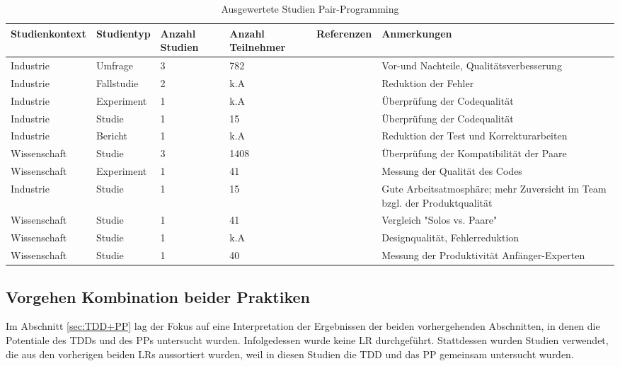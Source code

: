 \begin{table*}[t]
\renewcommand{\arraystretch}{1.3}
\caption{Ausgewertete Studien Pair-Programming}
\label{table:PPStudien}
\centering
\begin{tabularx}{\textwidth}{@{}lllllX@{}}
\toprule


Studienkontext & Studientyp & Anzahl Studien & Anzahl Teilnehmer & Referenzen & Anmerkungen \\ \midrule
Industrie & Umfrage & 3 & 782 & \cite{Bevan2002GuidelinesClass,Williams2006ExaminingProgrammers,Williams2010PairProgramming}  & Vor-und Nachteile, Qualitätsverbesserung \\
Industrie & Fallstudie & 2 & k.A & \cite{Bevan2002GuidelinesClass}  & Reduktion der Fehler \\
Industrie & Experiment & 1 & k.A & \cite{Williams2010PairProgramming}  & Überprüfung der Codequalität \\
Industrie & Studie & 1 & 15 & \cite{Bevan2002GuidelinesClass} & Überprüfung der Codequalität \\
Industrie & Bericht & 1 & k.A & \cite{Williams2010PairProgramming} & Reduktion der Test und Korrekturarbeiten \\
Wissenschaft & Studie & 3 & 1408 & \cite{Bevan2002GuidelinesClass,Williams2010PairProgramming}  & Überprüfung der Kompatibilität der Paare \\
Wissenschaft & Experiment & 1 & 41 & \cite{Bevan2002GuidelinesClass}  & Messung der Qualität des Codes \\
Industrie & Studie & 1 & 15 & \cite{Williams2006ExaminingProgrammers,Nosek1998TheProgramming}  & Gute Arbeitsatmosphäre; mehr Zuversicht im Team bzgl. der Produktqualität \\
Wissenschaft & Studie & 1 & 41 & \cite{Williams2000StrengtheningPair-Programming, Alshehri2014RankingProgramming}  & Vergleich "Solos vs. Paare" \\
Wissenschaft & Studie & 1 & k.A & \cite{Cockburn2001TheProgramming}  & Designqualität, Fehlerreduktion \\
Wissenschaft & Studie & 1 & 40 & \cite{Lui2006PairExpertexpert,Alshehri2014RankingProgramming} & Messung der Produktivität Anfänger-Experten \\ \bottomrule
\end{tabularx}
\end{table*}

\subsection{Vorgehen Kombination beider Praktiken}

Im Abschnitt \ref{sec:TDD+PP} lag der Fokus auf eine Interpretation der Ergebnissen der beiden vorhergehenden Abschnitten, in denen die Potentiale des TDDs und des PPs untersucht wurden. Infolgedessen wurde keine LR durchgeführt. Stattdessen wurden Studien verwendet, die aus den vorherigen beiden LRs aussortiert wurden, weil in diesen Studien die TDD und das PP gemeinsam untersucht wurden.
